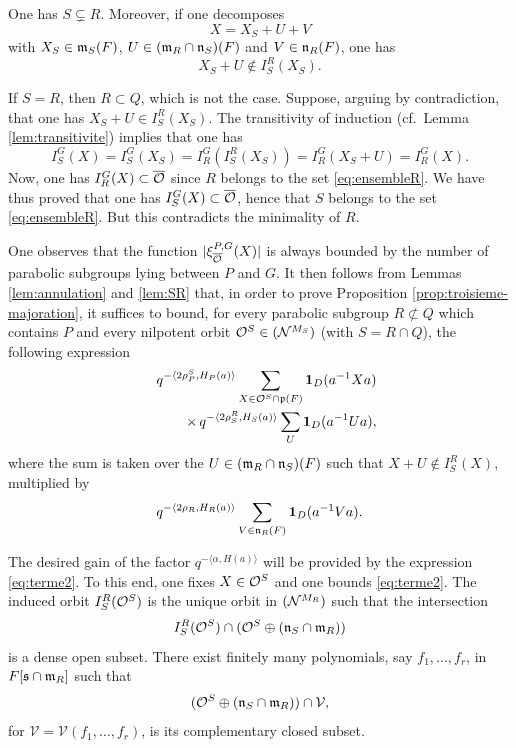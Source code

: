 \begin{paragr}
\begin{preuve}
\begin{lemme}\label{lem:SR}
  One has $S\subsetneq R$. Moreover, if one decomposes
$$X=X_S+U+V$$
with $X_S\in \mathfrak{m}_S(F)$, $U\in (\mathfrak{m}_R\cap \mathfrak{n}_S)(F)$ and $V\in \mathfrak{n}_R(F)$, one has
$$X_S+U\notin I_S^R(X_S).$$
\end{lemme}

\begin{preuve}
  If $S=R$, then $R\subset Q$, which is not the case. Suppose, arguing by contradiction, that one has $X_S+U\in I_S^R(X_S)$. The transitivity of induction (cf.\ Lemma \ref{lem:transitivite}) implies that one has
$$I_S^G(X)=I_S^G(X_S)=I_R^G(I_S^R(X_S))=I_R^G(X_S+U)=I_R^G(X).$$
Now, one has $I_R^G(X)\subset \overline{\mathcal{O}}$ since $R$ belongs to the set \eqref{eq:ensembleR}. We have thus proved that one has $I_S^G(X)\subset \overline{\mathcal{O}}$, hence that $S$ belongs to the set \eqref{eq:ensembleR}. But this contradicts the minimality of $R$.
\end{preuve}

One observes that the function $|\xi_{\overline{\mathcal{O}}}^{P,G}(X)|$ is always bounded by the number of parabolic subgroups lying between $P$ and $G$. It then follows from Lemmas \ref{lem:annulation} and \ref{lem:SR} that, in order to prove Proposition \ref{prop:troisieme-majoration}, it suffices to bound, for every parabolic subgroup $R\not\subset Q$ which contains $P$ and every nilpotent orbit $\mathcal{O}^S\in (\mathcal{N}^{M_S})$ (with $S=R\cap Q$), the following expression
\begin{eqnarray}
  &&q^{-\langle 2\rho_P^S,H_P(a)\rangle} \sum_{X\in \mathcal{O}^S\cap \mathfrak{p}(F)} \mathbf{1}_D(a^{-1}Xa) \label{eq:terme1}\\
  &&\qquad\times\, q^{-\langle 2\rho_S^R,H_S(a)\rangle} \sum_U \mathbf{1}_D(a^{-1}Ua), \label{eq:terme2}
\end{eqnarray}
where the sum is taken over the $U\in (\mathfrak{m}_R\cap \mathfrak{n}_S)(F)$ such that $X+U\notin I_S^R(X)$, multiplied by
\begin{equation}
  \label{eq:terme3}
  q^{-\langle 2\rho_R,H_R(a)\rangle} \sum_{V\in \mathfrak{n}_R(F)} \mathbf{1}_D(a^{-1}Va).
\end{equation}

The desired gain of the factor $q^{-\langle \alpha,H(a)\rangle}$ will be provided by the expression \eqref{eq:terme2}. To this end, one fixes $X\in \mathcal{O}^S$ and one bounds \eqref{eq:terme2}. The induced orbit $I_S^R(\mathcal{O}^S)$ is the unique orbit in $(\mathcal{N}^{M_R})$ such that the intersection
$$I_S^R(\mathcal{O}^S)\cap (\mathcal{O}^S\oplus (\mathfrak{n}_S\cap \mathfrak{m}_R))$$
is a dense open subset. There exist finitely many polynomials, say $f_1,\ldots,f_r$, in $F[\mathfrak{s}\cap \mathfrak{m}_R]$ such that
$$(\mathcal{O}^S\oplus (\mathfrak{n}_S\cap \mathfrak{m}_R))\cap \mathcal{V},$$
for $\mathcal{V}=\mathcal{V}(f_1,\ldots,f_r)$, is its complementary closed subset.


\end{preuve}
\end{paragr}
